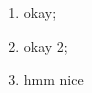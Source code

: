 \documentclass{article}
\begin{document}
\begin{enumerate}
\item okay;
\item okay 2;
\item hmm nice

\end{enumerate}
\end{document}
